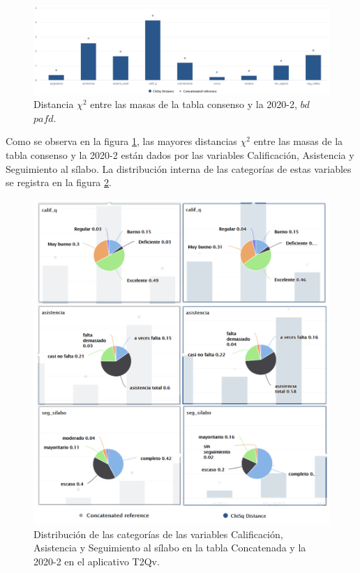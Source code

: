 \documentclass[mathematics,article,submit,moreauthors,pdftex]{mdpi}
\begin{document}
\begin{figure}[H]


\begin{center}\includegraphics[width=0.9\linewidth,]{chi20202n5} \end{center}

\caption{Distancia $\chi^2$ entre las masas de la tabla consenso y la 2020-2, $bd$ $pafd$.}
\label{fig:chi20202n5}
\end{figure}

Como se observa en la figura \ref{fig:chi20202n5}, las mayores
distancias \(\chi^2\) entre las masas de la tabla consenso y la 2020-2
están dados por las variables Calificación, Asistencia y Seguimiento al
sílabo. La distribución interna de las categorías de estas variables se
registra en la figura \ref{fig:dist20202n6}.

\begin{figure}[H]


\begin{center}\includegraphics[width=0.9\linewidth,]{dist20202n6} \end{center}

\caption{Distribución de las categorías de las variables Calificación, Asistencia y Seguimiento al sílabo en la tabla Concatenada y la 2020-2 en el aplicativo T2Qv.}
\label{fig:dist20202n6}
\end{figure}
\end{document}
